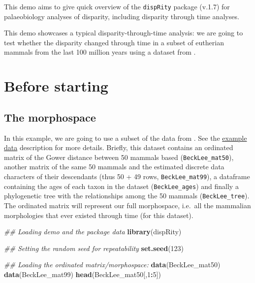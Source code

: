 \documentclass[
]{book}
\newenvironment{Shaded}{\begin{snugshade}}{\end{snugshade}}
\newcommand{\CommentTok}[1]{\textcolor[rgb]{0.56,0.35,0.01}{\textit{#1}}}
\newcommand{\DecValTok}[1]{\textcolor[rgb]{0.00,0.00,0.81}{#1}}
\newcommand{\KeywordTok}[1]{\textcolor[rgb]{0.13,0.29,0.53}{\textbf{#1}}}
\newcommand{\NormalTok}[1]{#1}
\newcommand{\OperatorTok}[1]{\textcolor[rgb]{0.81,0.36,0.00}{\textbf{#1}}}
\begin{document}
This demo aims to give quick overview of the \texttt{dispRity} package (v.1.7) for palaeobiology analyses of disparity, including disparity through time analyses.

This demo showcases a typical disparity-through-time analysis: we are going to test whether the disparity changed through time in a subset of eutherian mammals from the last 100 million years using a dataset from \citet{beckancient2014}.

\hypertarget{before-starting}{%
\section{Before starting}\label{before-starting}}

\hypertarget{the-morphospace}{%
\subsection{The morphospace}\label{the-morphospace}}

In this example, we are going to use a subset of the data from \citet{beckancient2014}.
See the \protect\hyperlink{example-data}{example data} description for more details.
Briefly, this dataset contains an ordinated matrix of the Gower distance between 50 mammals based (\texttt{BeckLee\_mat50}), another matrix of the same 50 mammals and the estimated discrete data characters of their descendants (thus 50 + 49 rows, \texttt{BeckLee\_mat99}), a dataframe containing the ages of each taxon in the dataset (\texttt{BeckLee\_ages}) and finally a phylogenetic tree with the relationships among the 50 mammals (\texttt{BeckLee\_tree}).
The ordinated matrix will represent our full morphospace, i.e.~all the mammalian morphologies that ever existed through time (for this dataset).

\begin{Shaded}
\begin{Highlighting}[]
\CommentTok{\#\# Loading demo and the package data}
\KeywordTok{library}\NormalTok{(dispRity)}

\CommentTok{\#\# Setting the random seed for repeatability}
\KeywordTok{set.seed}\NormalTok{(}\DecValTok{123}\NormalTok{)}

\CommentTok{\#\# Loading the ordinated matrix/morphospace:}
\KeywordTok{data}\NormalTok{(BeckLee\_mat50)}
\KeywordTok{data}\NormalTok{(BeckLee\_mat99)}
\KeywordTok{head}\NormalTok{(BeckLee\_mat50[,}\DecValTok{1}\OperatorTok{:}\DecValTok{5}\NormalTok{])}
\end{Highlighting}
\end{Shaded}
\end{document}
